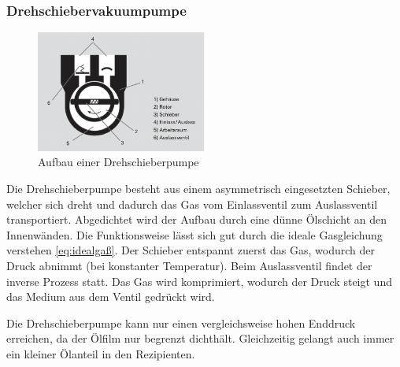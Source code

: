 \subsubsection{Drehschiebervakuumpumpe}
\begin{figure}[h]
    \centering
    \includegraphics[width=0.5\textwidth]{abb/drehpumpe.png}
    \caption{Aufbau einer Drehschieberpumpe \cite{Pfeifer}} 
    \label{fig:drehpumpe}
\end{figure} 
Die Drehschieberpumpe besteht aus einem asymmetrisch eingesetzten Schieber, 
welcher sich dreht und dadurch das Gas vom Einlassventil zum Auslassventil transportiert.
Abgedichtet wird der Aufbau durch eine dünne Ölschicht an den Innenwänden.
Die Funktionsweise lässt sich gut durch die ideale Gasgleichung verstehen \eqref{eq:idealgaß}.
Der Schieber entspannt zuerst das Gas, 
wodurch der Druck abnimmt (bei konstanter Temperatur).
Beim Auslassventil findet der inverse Prozess statt.
Das Gas wird komprimiert, wodurch der Druck steigt 
und das Medium aus dem Ventil gedrückt wird.

Die Drehschieberpumpe kann nur einen vergleichsweise hohen Enddruck erreichen,
da der Ölfilm nur begrenzt dichthält.
Gleichzeitig gelangt auch immer ein kleiner Ölanteil in den Rezipienten.
\newpage
